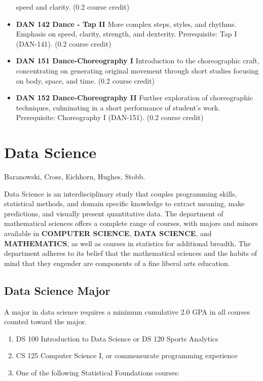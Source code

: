 \documentclass[
  letterpaper,
]{scrbook}
\providecommand{\tightlist}{%
  \setlength{\itemsep}{0pt}\setlength{\parskip}{0pt}}
\begin{document}
\begin{itemize}
  speed and clarity. (0.2 course credit)
\item
  \textbf{DAN 142 Dance - Tap II} More complex steps, styles, and
  rhythms. Emphasis on speed, clarity, strength, and dexterity.
  Prerequisite: Tap I (DAN-141). (0.2 course credit)
\item
  \textbf{DAN 151 Dance-Choreography I} Introduction to the
  choreographic craft, concentrating on generating original movement
  through short studies focusing on body, space, and time. (0.2 course
  credit)
\item
  \textbf{DAN 152 Dance-Choreography II} Further exploration of
  choreographic techniques, culminating in a short performance of
  student's work. Prerequisite: Choreography I (DAN-151). (0.2 course
  credit)
\end{itemize}

\section{Data Science}\label{data-science}

Baranowski, Cross, Eichhorn, Hughes, Stobb.

Data Science is an interdisciplinary study that couples programming
skills, statistical methods, and domain specific knowledge to extract
meaning, make predictions, and visually present quantitative data. The
department of mathematical sciences offers a complete range of courses,
with majors and minors available in \textbf{COMPUTER SCIENCE},
\textbf{DATA SCIENCE}, and \textbf{MATHEMATICS}, as well as courses in
statistics for additional breadth. The department adheres to its belief
that the mathematical sciences and the habits of mind that they engender
are components of a fine liberal arts education.

\subsection{Data Science Major}\label{data-science-major}

A major in data science requires a minimum cumulative 2.0 GPA in all
courses counted toward the major.

\begin{enumerate}
\def\labelenumi{\arabic{enumi}.}
\tightlist
\item
  DS 100 Introduction to Data Science or DS 120 Sports Analytics\\
\item
  CS 125 Computer Science I, or commensurate programming experience\\
\item
  One of the following Statistical Foundations courses:\\
\end{enumerate}
\end{document}
